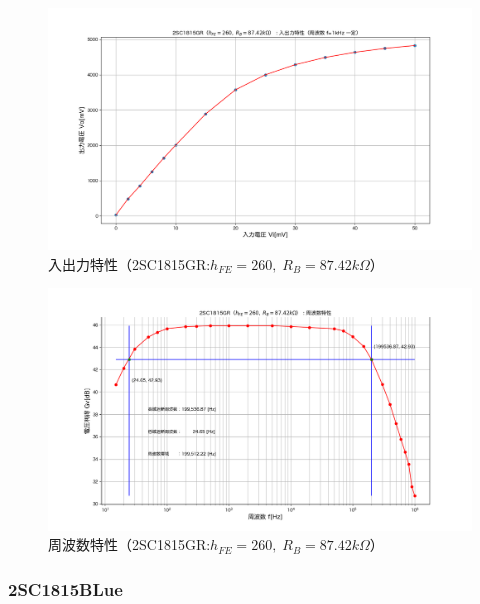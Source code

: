 \documentclass[uplatex,a4paper,11pt,oneside,openany]{jsbook}
\begin{document}
\newpage

  \begin{figure}[H]
    \centering
     \includegraphics[keepaspectratio, scale=0.48, angle=0]
                 {figs/png/iocharM1G.png}
                 \caption{入出力特性（2SC1815GR:$h_{FE}=260,\;R_B=87.42k\Omega$）}
                 \label{fig:iocharM1G}
 \end{figure}

 \begin{figure}[H]
    \centering
     \includegraphics[keepaspectratio, scale=0.48, angle=0]
               {figs/png/freqcharM1G.png}
               \caption{周波数特性（2SC1815GR:$h_{FE}=260,\;R_B=87.42k\Omega$）}
               \label{fig:freqcharM1G}
 \end{figure}

\newpage

\subsubsection{2SC1815BLue}
\end{document}
